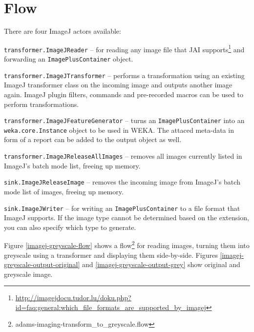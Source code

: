 \documentclass[a4paper]{book}
\begin{document}
\section{Flow}
There are four ImageJ actors available:
\begin{tight_itemize}
	\item \texttt{transformer.ImageJReader} -- for reading any image file that
	JAI supports\footnote{\url{http://imagejdocu.tudor.lu/doku.php?id=faq:general:which_file_formats_are_supported_by_imagej}{}}
	and forwarding an \texttt{ImagePlusContainer} object.
	\item \texttt{transformer.ImageJTransformer} -- performs a transformation
	using an existing ImageJ transformer class on the incoming image and
	outputs another image again. ImageJ plugin filters, commands and pre-recorded
	macros can be used to perform transformations.
	\item \texttt{transformer.ImageJFeatureGenerator} -- turns an
	\texttt{ImagePlusContainer} into an \texttt{weka.core.Instance} object to
	be used in WEKA. The attaced meta-data in form of a report can be added to the
	output object as well.
	\item \texttt{transformer.ImageJReleaseAllImages} -- removes all images
	currently listed in ImageJ's batch mode list, freeing up memory.
	\item \texttt{sink.ImageJReleaseImage} -- removes the incoming image from
	ImageJ's batch mode list of images, freeing up memory.
	\item \texttt{sink.ImageJWriter} -- for writing an \texttt{ImagePlusContainer}
	to a file format that ImageJ supports. If the image type cannot be
	determined based on the extension, you can also specify which type to generate.
\end{tight_itemize}

Figure \ref{imagej-greyscale-flow} shows a
flow\footnote{adams-imaging-transform\_to\_greyscale.flow} for reading images,
turning them into greyscale using a  transformer and displaying them
side-by-side.
Figures \ref{imagej-greyscale-output-original} and
\ref{imagej-greyscale-output-grey} show original and greyscale image.
\end{document}
